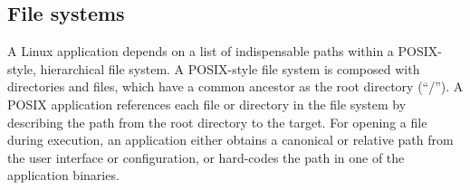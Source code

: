 \subsection{File systems}
\label{sec:libos:fs}


A Linux application depends on a list of indispensable paths
within a POSIX-style, hierarchical file system.
A POSIX-style file system is composed with directories and files, which have a common ancestor as the root directory (``/'').
A POSIX application references each file or directory in the file system
by describing the path %
from the root directory to the target. %
For opening a file during execution,
an application either obtains a canonical or relative path
from the user interface or configuration,
or hard-codes the path in one of the application binaries.













